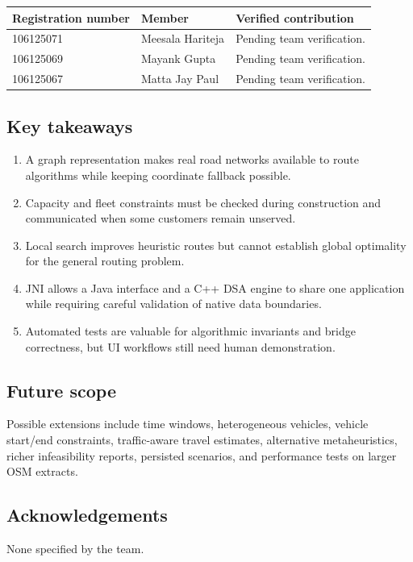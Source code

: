 \documentclass[11pt,a4paper]{article}
\begin{document}
\begin{table}[h]
\centering
\begin{tabularx}{\textwidth}{@{}p{}p{}X@{}}
\toprule
\textbf{Registration number} & \textbf{Member} & \textbf{Verified contribution}\\
\midrule
106125071 & Meesala Hariteja & Pending team verification.\\
106125069 & Mayank Gupta & Pending team verification.\\
106125067 & Matta Jay Paul & Pending team verification.\\
\bottomrule
\end{tabularx}
\end{table}

\subsection{Key takeaways}
\begin{enumerate}
    \item A graph representation makes real road networks available to route
          algorithms while keeping coordinate fallback possible.
    \item Capacity and fleet constraints must be checked during construction
          and communicated when some customers remain unserved.
    \item Local search improves heuristic routes but cannot establish global
          optimality for the general routing problem.
    \item JNI allows a Java interface and a C++ DSA engine to share one
          application while requiring careful validation of native data
          boundaries.
    \item Automated tests are valuable for algorithmic invariants and bridge
          correctness, but UI workflows still need human demonstration.
\end{enumerate}

\subsection{Future scope}
Possible extensions include time windows, heterogeneous vehicles, vehicle
start/end constraints, traffic-aware travel estimates, alternative
metaheuristics, richer infeasibility reports, persisted scenarios, and
performance tests on larger OSM extracts.

\subsection{Acknowledgements}
None specified by the team.
\end{document}
